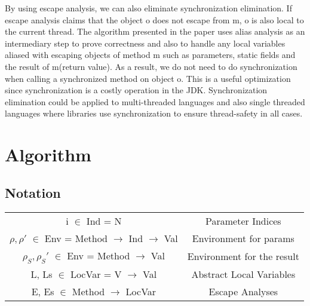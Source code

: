 \documentclass[peerreview]{IEEEtran}
\begin{document}
By using escape analysis, we can also eliminate synchronization elimination. If escape analysis claims that the object o does not escape from m, o is also local to the current thread. The algorithm presented in the paper uses alias analysis as an intermediary step to prove correctness and also to handle any local variables aliased with escaping objects of method m such as parameters, static fields and the result of m(return value). As a result, we do not need to do synchronization when calling a synchronized method on object o. This is a useful optimization since synchronization is a costly operation in the JDK. Synchronization elimination could be applied to multi-threaded languages and also single threaded languages where libraries use synchronization to ensure thread-safety in all cases. 
\section{Algorithm}
\subsection{Notation}
\begin{tabular}{| c | c |}
\hline
i $\in$ Ind = N & Parameter Indices \\
$\rho,\rho'$ $\in$ Env = Method $\rightarrow$ Ind $\rightarrow$ Val & Environment for params \\
$\rho_S,\rho_S'$ $\in$ Env = Method $\rightarrow$ Val & Environment for the result \\
L, Ls $\in$ LocVar = V $\rightarrow$ Val & Abstract Local Variables \\
E, Es $\in$ Method $\rightarrow$ LocVar & Escape Analyses \\
\hline
\end{tabular}
\end{document}
